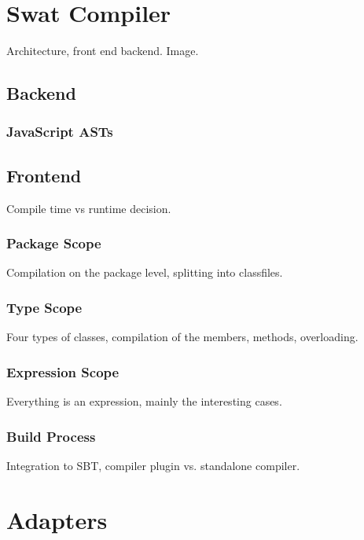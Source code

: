 \documentclass[12pt,a4paper]{report}
\begin{document}
\chapter{Swat Compiler}

Architecture, front end backend. Image.

\section{Backend}

\subsection{JavaScript ASTs}

\section{Frontend}

Compile time vs runtime decision.

\subsection{Package Scope}

Compilation on the package level, splitting into classfiles.

\subsection{Type Scope}

Four types of classes, compilation of the members, methods, overloading.

\subsection{Expression Scope}

Everything is an expression, mainly the interesting cases.

\subsection{Build Process}

Integration to SBT, compiler plugin vs. standalone compiler.



\chapter{Adapters}
\end{document}
